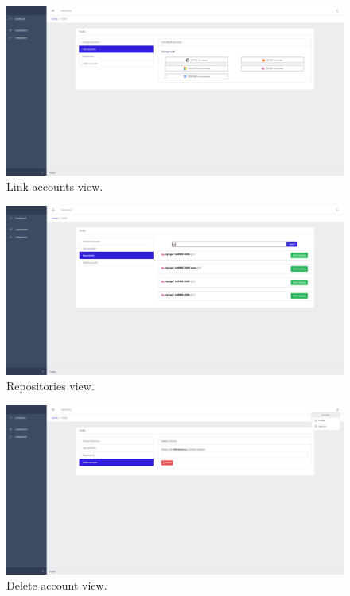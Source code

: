 \begin{figure}[ht]
    \centering
    \includegraphics[width=1\textwidth]{figures/views/link_accounts}
    \caption{Link accounts view.}
    \label{fig:link_accounts}
\end{figure}

\begin{figure}[ht]
    \centering
    \includegraphics[width=1\textwidth]{figures/views/repositories}
    \caption{Repositories view.}
    \label{fig:repositories}
\end{figure}

\begin{figure}[ht]
    \centering
    \includegraphics[width=1\textwidth]{figures/views/delete_account}
    \caption{Delete account view.}
    \label{fig:delete_account}
\end{figure}
